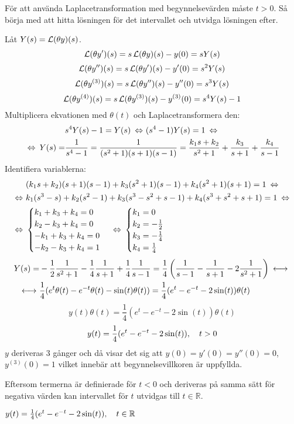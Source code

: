 \begin{task}{5.6}
	För att använda Laplacetransformation med begynnelsevärden måste $t > 0$. Så börja med att hitta lösningen för det intervallet och utvidga lösningen efter.
	
	Låt $Y(s)=\operatorname{\mathcal{L}}(\theta y)(s)$.
	\[\operatorname{\mathcal{L}}(\theta y')(s)=s\operatorname{\mathcal{L}}(\theta y)(s)-y(0)=sY(s)\]
	\[\operatorname{\mathcal{L}}(\theta y'')(s)=s\operatorname{\mathcal{L}}(\theta y')(s)-y'(0)=s^2Y(s)\]
	\[\operatorname{\mathcal{L}}(\theta y^{(3)})(s)=s\operatorname{\mathcal{L}}(\theta y'')(s)-y''(0)=s^3Y(s)\]
	\[\operatorname{\mathcal{L}}(\theta y^{(4)})(s)=s\operatorname{\mathcal{L}}(\theta y^{(3)})(s)-y^{(3)}(0)=s^4Y(s)-1\]
	Multiplicera ekvationen med $\theta(t)$ och Laplacetransformera den:
	\begin{align*}
	&s^4Y(s)-1=Y(s) \lra
	(s^4-1)Y(s)=1 \lra \\ \lra
	Y(s)=&\frac{1}{s^4-1}=
	\frac{1}{(s^2+1)(s+1)(s-1)}=
	\frac{k_1s+k_2}{s^2+1}+\frac{k_3}{s+1}+\frac{k_4}{s-1}
	\end{align*}
	Identifiera variablerna:
	\begin{align*}
	&(k_1s+k_2)(s+1)(s-1)+k_3(s^2+1)(s-1)+k_4(s^2+1)(s+1)=1 \lra \\ \lra
	&k_1(s^3-s)+k_2(s^2-1)+k_3(s^3-s^2+s-1)+k_4(s^3+s^2+s+1)=1 \lra \\ \lra
	&\begin{cases}
	k_1+k_3+k_4=0 \\
	k_2-k_3+k_4=0 \\
	-k_1+k_3+k_4=0 \\
	-k_2-k_3+k_4=1
	\end{cases} \lra
	\begin{cases}
	k_1=0 \\
	k_2=-\frac{1}{2} \\
	k_3=-\frac{1}{4} \\
	k_4=\frac{1}{4}
	\end{cases}
	\end{align*}
	\begin{align*}
	Y(s)=
	&-\frac{1}{2}\*\frac{1}{s^2+1}-\frac{1}{4}\frac{1}{s+1}+\frac{1}{4}\*\frac{1}{s-1}=
	\frac{1}{4}\left(\frac{1}{s-1}-\frac{1}{s+1}-2\frac{1}{s^2+1}\right) \llra \\ \llra
	&\frac{1}{4}(e^{t}\theta(t)-e^{-t}\theta(t)-\sin(t)\theta(t))=
	\frac{1}{4}(e^{t}-e^{-t}-2\sin(t))\theta(t)
	\end{align*}
	\[y(t)\theta(t)=\frac{1}{4}(e^{t}-e^{-t}-2\sin(t))\theta(t)\]
	\[y(t)=\frac{1}{4}(e^{t}-e^{-t}-2\sin(t)), \quad t>0\]
	$y$ deriveras 3 gånger och då visar det sig att $y(0)=y'(0)=y''(0)=0$, $y^{(3)}(0)=1$ vilket innebär att begynnelsevillkoren är uppfyllda.
	
	Eftersom termerna är definierade för $t<0$ och deriveras på samma sätt för negativa värden kan intervallet för $t$ utvidgas till $t\in\mathbb{R}$.
	
	\ans $y(t)=\frac{1}{4}(e^{t}-e^{-t}-2\sin(t)), \quad t\in\mathbb{R}$
\end{task}

